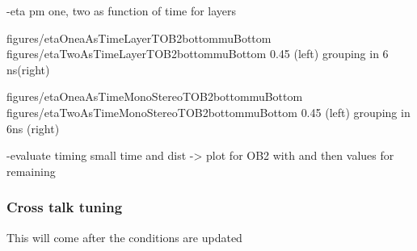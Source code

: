 -eta pm one, two as function of time for layers %


                 {figures/etaOneaAsTimeLayerTOB2bottommuBottom}
                 {figures/etaTwoAsTimeLayerTOB2bottommuBottom} %
                 {0.45}       %
                 {(left) grouping in 6 ns(right)}


                 {figures/etaOneaAsTimeMonoStereoTOB2bottommuBottom}
                 {figures/etaTwoAsTimeMonoStereoTOB2bottommuBottom} %
                 {0.45}       %
                 {(left) grouping in 6ns (right)}



-evaluate timing small time and dist ->  plot for OB2 with  and then values for remaining %




\subsubsection{Cross talk tuning}

This will come after the conditions are updated

